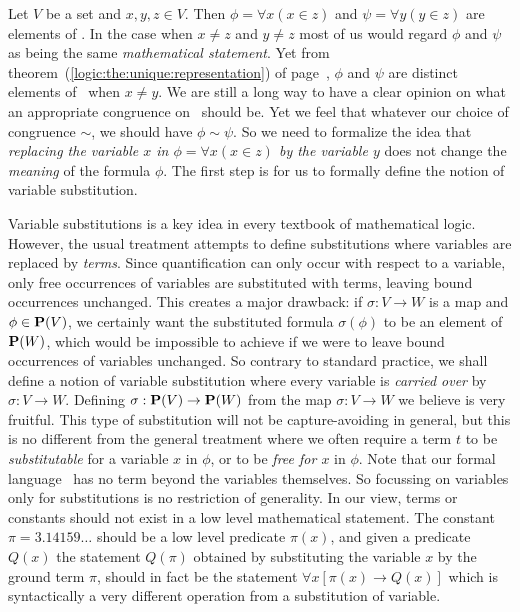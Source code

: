 Let $V$ be a set and $x,y,z\in V$. Then $\phi=\forall x(x\in z)$ and
$\psi=\forall y(y\in z)$ are elements of \pv. In the case when
$x\neq z$ and $y\neq z$ most of us would regard $\phi$ and $\psi$ as
being the same {\em mathematical statement}. Yet from
theorem~(\ref{logic:the:unique:representation}) of
page~\pageref{logic:the:unique:representation}, $\phi$ and $\psi$
are distinct elements of \pv\ when $x\neq y$. We are still a long
way to have a clear opinion on what an appropriate congruence on
\pv\ should be. Yet we feel that whatever our choice of congruence
$\sim$, we should have $\phi\sim\psi$. So we need to formalize the
idea that {\em replacing the variable $x$ in $\phi=\forall x(x\in
z)$ by the variable $y$} does not change the {\em meaning} of the
formula $\phi$. The first step is for us to formally define the
notion of variable substitution.

Variable substitutions is a key idea in every textbook of
mathematical logic. However, the usual treatment attempts to define
substitutions where variables are replaced by {\em terms}. Since
quantification can only occur with respect to a variable, only free
occurrences of variables are substituted with terms, leaving bound
occurrences unchanged. This creates a major drawback: if
$\sigma:V\to W$ is a map and $\phi\in\mbox{${\bf P}(V)$}$, we certainly want the
substituted formula $\sigma(\phi)$ to be an element of ${\bf P}(W)$,
which would be impossible to achieve if we were to leave bound
occurrences of variables unchanged. So contrary to standard
practice, we shall define a notion of variable substitution where
every variable is {\em carried over} by $\sigma:V\to W$. Defining
$\sigma:\mbox{${\bf P}(V)$}\to{\bf P}(W)$ from the map $\sigma:V\to W$ we believe is
very fruitful. This type of substitution will not be
capture-avoiding in general, but this is no different from the
general treatment where we often require a term $t$ to be {\em
substitutable} for a variable $x$ in $\phi$, or to be {\em free for
$x$} in $\phi$. Note that our formal language \pv\ has no term
beyond the variables themselves. So focussing on variables only for
substitutions is no restriction of generality. In our view, terms or
constants should not exist in a low level mathematical statement.
The constant $\pi=3.14159\ldots$ should be a low level predicate
$\pi(x)$, and given a predicate $Q(x)$ the statement $Q(\pi)$
obtained by substituting the variable $x$ by the ground term $\pi$,
should in fact be the statement $\forall x[\pi(x)\to Q(x)]$ which is
syntactically a very different operation from a substitution of
variable. 

